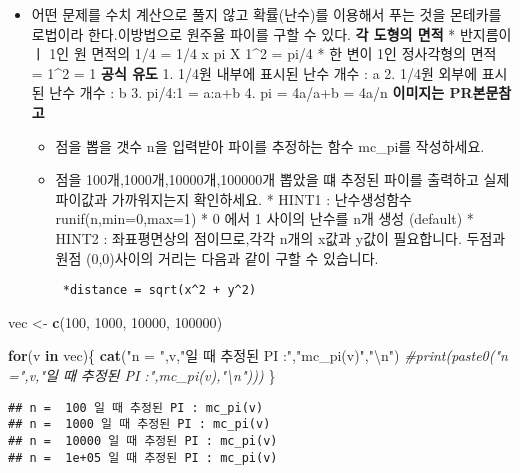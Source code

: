 \documentclass[
]{article}
\newenvironment{Shaded}{\begin{snugshade}}{\end{snugshade}}
\newcommand{\CharTok}[1]{\textcolor[rgb]{0.31,0.60,0.02}{#1}}
\newcommand{\CommentTok}[1]{\textcolor[rgb]{0.56,0.35,0.01}{\textit{#1}}}
\newcommand{\ControlFlowTok}[1]{\textcolor[rgb]{0.13,0.29,0.53}{\textbf{#1}}}
\newcommand{\DecValTok}[1]{\textcolor[rgb]{0.00,0.00,0.81}{#1}}
\newcommand{\KeywordTok}[1]{\textcolor[rgb]{0.13,0.29,0.53}{\textbf{#1}}}
\newcommand{\NormalTok}[1]{#1}
\newcommand{\StringTok}[1]{\textcolor[rgb]{0.31,0.60,0.02}{#1}}
\begin{document}
\begin{itemize}
\item
  어떤 문제를 수치 계산으로 풀지 않고 확률(난수)를 이용해서 푸는 것을
  몬테카를로법이라 한다.이방법으로 원주율 파이를 구할 수 있다.
  \textbf{각 도형의 면적} * 반지름이ㅣ 1인 원 면적의 1/4 = 1/4 x pi X
  1\^{}2 = pi/4 * 한 변이 1인 정사각형의 면적 = 1\^{}2 = 1 \textbf{공식
  유도} 1. 1/4원 내부에 표시된 난수 개수 : a 2. 1/4원 외부에 표시된 난수
  개수 : b 3. pi/4:1 = a:a+b 4. pi = 4a/a+b = 4a/n \textbf{이미지는
  PR본문참고}

  \begin{itemize}
  \item
    점을 뽑을 갯수 n을 입력받아 파이를 추정하는 함수 mc\_pi를
    작성하세요.
  \item
    점을 100개,1000개,10000개,100000개 뽑았을 떄 추정된 파이를 출력하고
    실제 파이값과 가까워지는지 확인하세요. * HINT1 : 난수생성함수
    runif(n,min=0,max=1) * 0 에서 1 사이의 난수를 n개 생성 (default) *
    HINT2 : 좌표평면상의 점이므로,각각 n개의 x값과 y값이 필요합니다.
    두점과 원점 (0,0)사이의 거리는 다음과 같이 구할 수 있습니다.

\begin{verbatim}
 *distance = sqrt(x^2 + y^2)
\end{verbatim}
  \end{itemize}
\end{itemize}

\begin{Shaded}
\begin{Highlighting}[]
\NormalTok{vec <-}\StringTok{ }\KeywordTok{c}\NormalTok{(}\DecValTok{100}\NormalTok{, }\DecValTok{1000}\NormalTok{, }\DecValTok{10000}\NormalTok{, }\DecValTok{100000}\NormalTok{)}

\ControlFlowTok{for}\NormalTok{(v }\ControlFlowTok{in}\NormalTok{ vec)\{}
  \KeywordTok{cat}\NormalTok{(}\StringTok{"n = "}\NormalTok{,v,}\StringTok{"일 때 추정된 PI :"}\NormalTok{,}\StringTok{"mc_pi(v)"}\NormalTok{,}\StringTok{"}\CharTok{\textbackslash{}n}\StringTok{"}\NormalTok{)}
  \CommentTok{#print(paste0("n =",v,"일 때 추정된 PI :",mc_pi(v),"\textbackslash{}n")))}
\NormalTok{\}}
\end{Highlighting}
\end{Shaded}

\begin{verbatim}
## n =  100 일 때 추정된 PI : mc_pi(v) 
## n =  1000 일 때 추정된 PI : mc_pi(v) 
## n =  10000 일 때 추정된 PI : mc_pi(v) 
## n =  1e+05 일 때 추정된 PI : mc_pi(v)
\end{verbatim}
\end{document}
